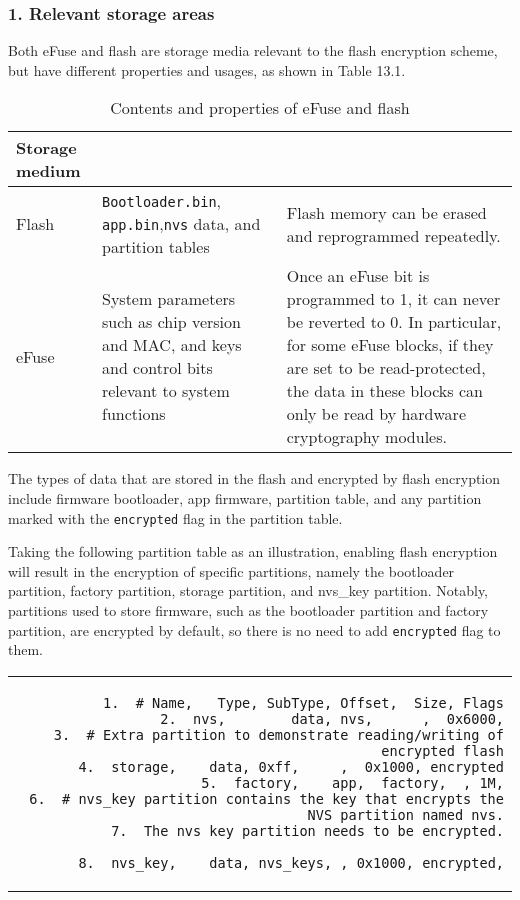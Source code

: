 \documentclass[a4paper,12pt]{book}
\begin{document}
\subsubsection{1. Relevant storage areas}
Both eFuse and flash are storage media relevant to the flash encryption scheme, but have different properties and usages, as shown in Table 13.1.

\begin{table}[h!]
    \renewcommand{\arraystretch}{1.4}
    \caption{Contents and properties of eFuse and flash}
    \begin{tabular}{|>{\Centering}m{5em}|>{\RaggedRight}m{15em}|>{\RaggedRight}m{18em}|}
        \hline
        \rowcolor{LightBlue} \textbf{Storage medium}&\multicolumn{1}{c|}{\textbf{Contents}}&\multicolumn{1}{c|}{\textbf{Properties}}\\
        \hline
        Flash&\verb|Bootloader.bin|, \verb|app.bin|,\newline\verb|nvs| data, and partition tables&Flash memory can be erased and reprogrammed repeatedly.\\
        \hline
        eFuse&System parameters such as chip version and MAC, and keys and control bits relevant to system functions&Once an eFuse bit is programmed to 1, it can never be reverted to 0. In particular, for some eFuse blocks, if they are set to be read-protected, the data in these blocks can only be read by hardware cryptography modules.\\
        \hline
    \end{tabular}
\end{table}

The types of data that are stored in the flash and encrypted by flash encryption include firmware bootloader, app firmware, partition table, and any partition marked with the \verb|encrypted| flag in the partition table.

Taking the following partition table as an illustration, enabling flash encryption will result in the encryption of specific partitions, namely the bootloader partition, factory partition, storage partition, and nvs\_key partition. Notably, partitions used to store firmware, such as the bootloader partition and factory partition, are encrypted by default, so there is no need to add \verb|encrypted| flag to them.

\begin{codebloc}
\begin{tabular}{d}
\vspace{2pt}
\fontsize{9.5pt}{10pt}\selectfont
\begin{verbatim}
1.  # Name,   Type, SubType, Offset,  Size, Flags
2.  nvs,        data, nvs,      ,  0x6000,
3.  # Extra partition to demonstrate reading/writing of encrypted flash
4.  storage,    data, 0xff,     ,  0x1000, encrypted
5.  factory,    app,  factory,  , 1M,
6.  # nvs_key partition contains the key that encrypts the NVS partition named nvs.
7.  The nvs_key partition needs to be encrypted.
\end{verbatim}
\verb|8.  nvs_key,    data, nvs_keys, , 0x1000, encrypted,|
\end{tabular}
\end{codebloc}
\end{document}
